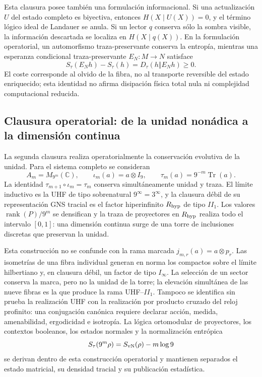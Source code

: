 Esta clausura posee también una formulación informacional. Si una actualización
\(U\) del estado completo es biyectiva, entonces
\(H(X\mid U(X))=0\), y el término lógico ideal de Landauer se anula. Si un
lector \(q\) conserva sólo la sombra visible, la información descartada se
localiza en \(H(X\mid q(X))\). En la formulación operatorial, un automorfismo
traza-preservante conserva la entropía, mientras una esperanza condicional
traza-preservante \(E_N:M\to N\) satisface
\[
 S_\tau(E_Nh)-S_\tau(h)=D_\tau(h\Vert E_Nh)\geq0.
\]
El coste corresponde al olvido de la fibra, no al transporte reversible del
estado enriquecido; esta identidad no afirma disipación física total nula ni
complejidad computacional reducida.

\subsection*{Clausura operatorial: de la unidad nonádica a la dimensión continua}

La segunda clausura realiza operatorialmente la conservación evolutiva de la
unidad. Para el sistema completo se consideran
\[
 A_m=M_{9^m}(\mathbb C),
 \qquad \iota_m(a)=a\otimes I_9,
 \qquad
 \tau_m(a)=9^{-m}\operatorname{Tr}(a).
\]
La identidad \(\tau_{m+1}\circ\iota_m=\tau_m\) conserva simultáneamente
unidad y traza. El límite inductivo es la UHF de tipo sobrenatural
\(9^\infty=3^\infty\), y la clausura débil de su representación GNS tracial es
el factor hiperinfinito \(R_{\rm hyp}\) de tipo \(II_1\). Los valores
\(\operatorname{rank}(P)/9^m\) se densifican y la traza de proyectores en
\(R_{\rm hyp}\) realiza todo el intervalo \([0,1]\): una dimensión continua
surge de una torre de inclusiones discretas que preservan la unidad.

Esta construcción no se confunde con la rama marcada
\(j_{m,r}(a)=a\otimes p_r\). Las isometrías de una fibra individual generan en
norma los compactos sobre el límite hilbertiano y, en clausura débil, un factor
de tipo \(I_\infty\). La selección de un sector conserva la marca, pero no la
unidad de la torre; la elevación simultánea de las nueve fibras es la que
produce la rama UHF--\(II_1\). Tampoco se identifica sin prueba la realización
UHF con la realización por producto cruzado del reloj profinito: una
conjugación canónica requiere declarar acción, medida, amenabilidad,
ergodicidad e isotropía. La lógica ortomodular de proyectores, los contextos
booleanos, los estados normales y la normalización entrópica
\[
 S_\tau(9^m\rho)=S_{\rm vN}(\rho)-m\log9
\]
se derivan dentro de esta construcción operatorial y mantienen separados el
estado matricial, su densidad tracial y su publicación estadística.


